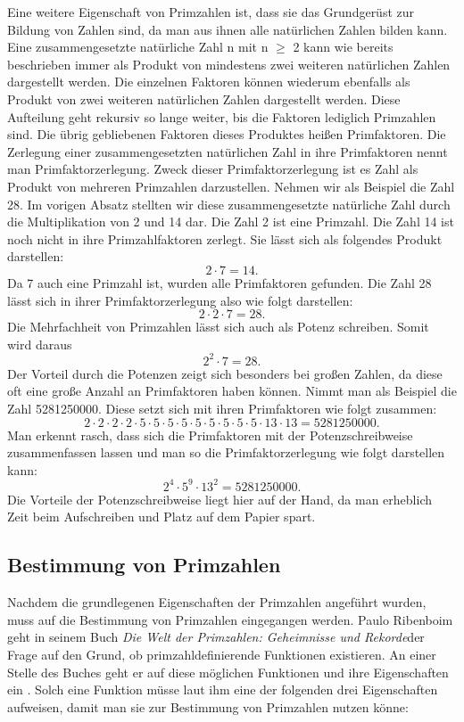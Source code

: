 Eine weitere Eigenschaft von Primzahlen ist, dass sie das Grundgerüst zur Bildung von Zahlen sind, da man aus ihnen alle natürlichen Zahlen bilden kann. Eine zusammengesetzte natürliche Zahl n mit n $\geq$ 2 kann wie bereits beschrieben immer als Produkt von mindestens zwei weiteren natürlichen Zahlen dargestellt werden. Die einzelnen Faktoren können wiederum ebenfalls als Produkt von zwei weiteren natürlichen Zahlen dargestellt werden. Diese Aufteilung geht rekursiv so lange weiter, bis die Faktoren lediglich Primzahlen sind. Die übrig gebliebenen Faktoren dieses Produktes heißen Primfaktoren. Die Zerlegung einer zusammengesetzten natürlichen Zahl in ihre Primfaktoren nennt man Primfaktorzerlegung. Zweck dieser Primfaktorzerlegung ist es Zahl als Produkt von mehreren Primzahlen darzustellen. Nehmen wir als Beispiel die Zahl 28. Im vorigen Absatz stellten wir diese zusammengesetzte natürliche Zahl durch die Multiplikation von 2 und 14 dar. Die Zahl 2 ist eine Primzahl. Die Zahl 14 ist noch nicht in ihre Primzahlfaktoren zerlegt. Sie lässt sich als folgendes Produkt darstellen: \[2 \cdot 7=14.\] Da 7 auch eine Primzahl ist, wurden alle Primfaktoren gefunden. Die Zahl 28 lässt sich in ihrer Primfaktorzerlegung also wie folgt darstellen: \[2 \cdot 2 \cdot 7=28.\] Die Mehrfachheit von Primzahlen lässt sich auch als Potenz schreiben. Somit wird daraus \[2^{2} \cdot 7=28.\] Der Vorteil durch die Potenzen zeigt sich besonders bei großen Zahlen, da diese oft eine große Anzahl an Primfaktoren haben können. Nimmt man als Beispiel die Zahl 5281250000. Diese setzt sich mit ihren Primfaktoren wie folgt zusammen: \[2 \cdot 2 \cdot 2 \cdot 2 \cdot 5 \cdot 5 \cdot 5 \cdot 5 \cdot 5 \cdot 5 \cdot 5 \cdot 5 \cdot 5 \cdot 13 \cdot 13=5281250000.\] Man erkennt rasch, dass sich die Primfaktoren mit der Potenzschreibweise zusammenfassen lassen und man so die Primfaktorzerlegung wie folgt darstellen kann: \[2^{4} \cdot 5^{9} \cdot 13^{2}=5281250000.\] Die Vorteile der Potenzschreibweise liegt hier auf der Hand, da man erheblich Zeit beim Aufschreiben und Platz auf dem Papier spart.

\subsection{Bestimmung von Primzahlen}\label{sec:bestimmung_primzahlen}
Nachdem die grundlegenen Eigenschaften der Primzahlen angeführt wurden, muss auf die Bestimmung von Primzahlen eingegangen werden. Paulo Ribenboim geht in seinem Buch \glqq\textit{Die Welt der Primzahlen: Geheimnisse und Rekorde}\grqq der Frage auf den Grund, ob primzahldefinierende Funktionen existieren. An einer Stelle des Buches geht er auf diese möglichen Funktionen und ihre Eigenschaften ein \cite[S. 137]{Ribenboim.2011}. Solch eine Funktion müsse laut ihm eine der folgenden drei Eigenschaften aufweisen, damit man sie zur Bestimmung von Primzahlen nutzen könne:

